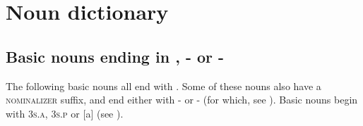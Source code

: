 \chapter{Noun dictionary} \label{ch:noun dictionary}
\section{Basic nouns ending in  {\nounstemformer},  {\nominalizer-\nounstemformer} or  {\nominalizer-\nounstemformer}} \label{ch:basic nouns ending in [-aˀ], [-tr-aˀ] or [-hsr-aˀ]}
The following basic nouns all end with  {\nounstemformer}. Some of these nouns also have a \textsc{nominalizer} suffix, and end either with   \textsc{\nominalizer-\nsf} or  \textsc{\nominalizer-\nsf} (for which, see ). Basic nouns begin with  \textsc{3s.a},  \textsc{3s.p} or [a] (see ).

